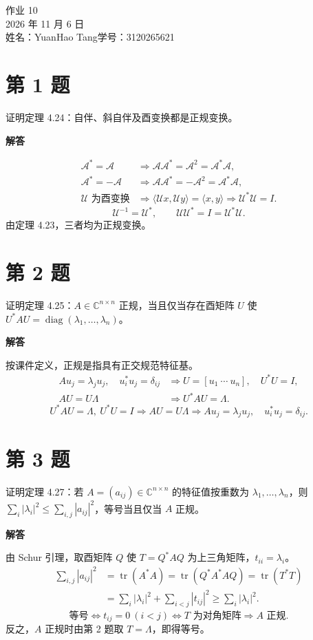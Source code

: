 \documentclass[UTF8,10pt,letterpaper,fontset=fandol]{ctexart}
\newcommand{\C}{\mathbb C}
\newcommand{\ip}[2]{\langle #1,#2\rangle}
\DeclareMathOperator{\tr}{tr}
\begin{document}
\begin{center}
{\LARGE 作业 10}\\[0.5em]
2026 年 11 月 6 日\\[0.25em]
姓名：YuanHao Tang\quad 学号：3120265621
\end{center}
\section{第 1 题}
证明定理 4.24：自伴、斜自伴及酉变换都是正规变换。
\par{}\textbf{解答}\par

\begin{align*}
 \mathcal A^*=\mathcal A&\Longrightarrow
 \mathcal A\mathcal A^*=\mathcal A^2=\mathcal A^*\mathcal A,\\
 \mathcal A^*=-\mathcal A&\Longrightarrow
 \mathcal A\mathcal A^*=-\mathcal A^2=\mathcal A^*\mathcal A,\\
 \mathcal U\text{ 为酉变换}&\Longrightarrow
 \ip{\mathcal Ux}{\mathcal Uy}=\ip xy
 \Longrightarrow \mathcal U^*\mathcal U=I.
\end{align*}
\[
 \mathcal U^{-1}=\mathcal U^*,\qquad
 \mathcal U\mathcal U^*=I=\mathcal U^*\mathcal U.
\]
由定理 4.23，三者均为正规变换。
\section{第 2 题}
证明定理 4.25：$A\in\C^{n\times n}$ 正规，当且仅当存在酉矩阵 $U$ 使 $U^*AU=\operatorname{diag}(\lambda_1,\ldots,\lambda_n)$。
\par{}\textbf{解答}\par
按课件定义，正规是指具有正交规范特征基。
\begin{align*}
 Au_j=\lambda_ju_j,\quad u_i^*u_j=\delta_{ij}
 &\Longrightarrow U=[u_1\ \cdots\ u_n],\quad U^*U=I,\\
 AU=U\Lambda&\Longrightarrow U^*AU=\Lambda.
\end{align*}
\[
 U^*AU=\Lambda,\ U^*U=I
 \Longrightarrow AU=U\Lambda
 \Longrightarrow Au_j=\lambda_ju_j,\quad u_i^*u_j=\delta_{ij}.
\]
\section{第 3 题}
证明定理 4.27：若 $A=(a_{ij})\in\C^{n\times n}$ 的特征值按重数为 $\lambda_1,\ldots,\lambda_n$，则 $\sum_i|\lambda_i|^2\le\sum_{i,j}|a_{ij}|^2$，等号当且仅当 $A$ 正规。
\par{}\textbf{解答}\par
由 Schur 引理，取酉矩阵 $Q$ 使 $T=Q^*AQ$ 为上三角矩阵，$t_{ii}=\lambda_i$。
\begin{align*}
 \sum_{i,j}|a_{ij}|^2
 &=\tr(A^*A)=\tr(Q^*A^*A Q)=\tr(T^*T)\\
 &=\sum_i|\lambda_i|^2+\sum_{i<j}|t_{ij}|^2
 \ge\sum_i|\lambda_i|^2.
\end{align*}
\[
 \text{等号}\iff t_{ij}=0\ (i<j)
 \iff T\text{ 为对角矩阵}\Longrightarrow A\text{ 正规}.
\]
反之，$A$ 正规时由第 2 题取 $T=\Lambda$，即得等号。
\newpage
\end{document}
